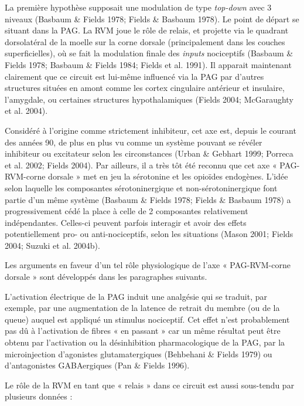 \documentclass[a4paper,12pt,twoside]{report}
\begin{document}
La première hypothèse supposait une modulation de type \textit{top-down} avec 3 niveaux (Basbaum \& Fields 1978; Fields \& Basbaum 1978). Le point de départ se situant dans la PAG. La RVM joue le rôle de relais, et projette via le quadrant dorsolatéral de la moelle sur la corne dorsale (principalement dans les couches superficielles), où se fait la modulation finale des \textit{inputs} nociceptifs (Basbaum \& Fields 1978; Basbaum \& Fields 1984; Fields et al. 1991). Il apparait maintenant clairement que ce circuit est lui-même influencé via la PAG par d’autres structures situées en amont comme les cortex cingulaire antérieur et insulaire, l’amygdale, ou certaines structures hypothalamiques (Fields 2004; McGaraughty et al. 2004). 

Considéré à l’origine comme strictement inhibiteur, cet axe est, depuis le courant des années 90, de plus en plus vu comme un système pouvant se révéler inhibiteur ou excitateur selon les circonstances (Urban \& Gebhart 1999; Porreca et al. 2002; Fields 2004). Par ailleurs, il a très tôt été reconnu que cet axe « PAG-RVM-corne dorsale » met en jeu la sérotonine et les opioïdes endogènes. L’idée selon laquelle les composantes sérotoninergique et non-sérotoninergique font partie d’un même système (Basbaum \& Fields 1978; Fields \& Basbaum 1978) a progressivement cédé la place à celle de 2 composantes relativement indépendantes. Celles-ci peuvent parfois interagir et avoir des effets potentiellement pro- ou anti-nociceptifs, selon les situations (Mason 2001; Fields 2004; Suzuki et al. 2004b). 

\bigskip

Les arguments en faveur d’un tel rôle physiologique de l’axe « PAG-RVM-corne dorsale » sont développés dans les paragraphes suivants. 

L’activation électrique de la PAG induit une analgésie qui se traduit, par exemple, par une augmentation de la latence de retrait du membre (ou de la queue) auquel est appliqué un stimulus nociceptif. Cet effet n’est probablement pas dû à l’activation de fibres « en passant » car un même résultat peut être obtenu par l’activation ou la désinhibition pharmacologique de la PAG, par la microinjection d’agonistes glutamatergiques (Behbehani \& Fields 1979) ou d’antagonistes GABAergiques (Pan \& Fields 1996).

Le rôle de la RVM en tant que « relais » dans ce circuit est aussi sous-tendu par plusieurs données :
\end{document}
